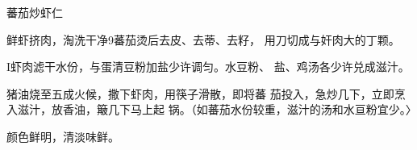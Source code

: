 \begin{recipe}{蕃茄炒虾仁}

\ingredients


\cooking

\step 鲜虾挤肉，淘洗干净9蕃茄烫后去皮、去蒂、去籽， 用刀切成与奸肉大的丁颗。

I虾肉滤干水份，与蛋清豆粉加盐少许调匀。水豆粉、 盐、鸡汤各少许兑成滋汁。

\step 猪油烧至五成火候，撒下虾肉，用筷子滑散，即将蕃 茄投入，急炒几下，立即烹入滋汁，放香油，簸几下马上起 锅。（如蕃茄水份较重，滋汁的汤和水亘粉宜少。〉

\notes

颜色鲜明，清淡味鲜。

\end{recipe}

